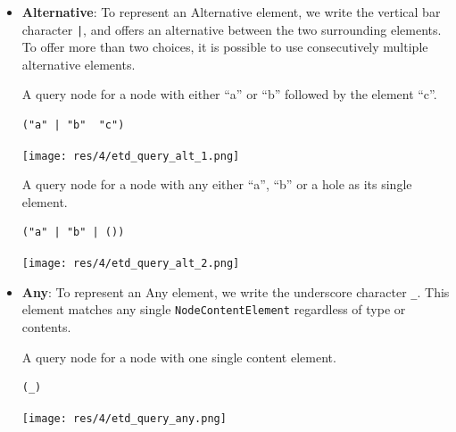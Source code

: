 \begin{chapterBody}
\begin{itemize}
    \item \textbf{Alternative}: To represent an Alternative element, we write
the vertical bar character \texttt{|}, and offers an alternative between the
two surrounding elements. To offer more than two choices, it is possible to
use consecutively multiple alternative elements.

\begin{minipage}{.3\linewidth}
A query node for a node with either ``a'' or ``b''
followed by the element ``c''.
\end{minipage}
\hspace{.02\linewidth}
\begin{minipage}{.3\linewidth}
\begin{lstlisting}[language=etl]
("a" | "b"  "c")
\end{lstlisting} 
\end{minipage}
\hspace{.02\linewidth}
\begin{minipage}{.3\linewidth}
\texttt{[image: res/4/etd\_query\_alt\_1.png]}
\end{minipage}

\begin{minipage}{.3\linewidth}
A query node for a node with any either ``a'', ``b'' or a hole as its
single element.
\end{minipage}
\hspace{.02\linewidth}
\begin{minipage}{.3\linewidth}
\begin{lstlisting}[language=etl]
("a" | "b" | ())
\end{lstlisting}
\end{minipage}
\hspace{.02\linewidth}
\begin{minipage}{.3\linewidth}
\texttt{[image: res/4/etd\_query\_alt\_2.png]}
\end{minipage}
    
    \item \textbf{Any}: To represent an Any element, we write the underscore
character \texttt{\_}. This element matches any single 
\texttt{NodeContentElement} regardless of type or contents.

\begin{minipage}{.3\linewidth}
A query node for a node with one single content element.
\end{minipage}
\hspace{.02\linewidth}
\begin{minipage}{.3\linewidth}
\begin{lstlisting}[language=etl]
(_)
\end{lstlisting} 
\end{minipage}
\hspace{.02\linewidth}
\begin{minipage}{.3\linewidth}
\texttt{[image: res/4/etd\_query\_any.png]}
\end{minipage}


\end{itemize}
\end{chapterBody}
